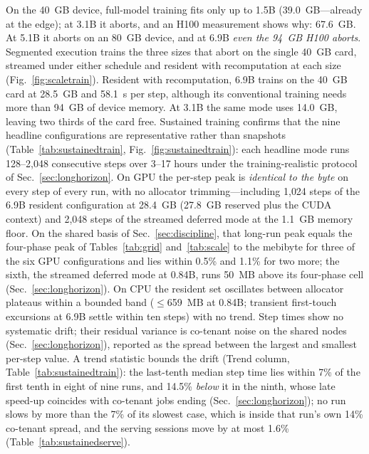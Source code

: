 \documentclass[journal]{IEEEtran}
\begin{document}
On the 40~GB device, full-model training
fits only up to 1.5B (39.0~GB---already at the edge); at 3.1B it aborts, and
an H100 measurement shows why: 67.6~GB. At 5.1B it aborts on an 80~GB device,
and at 6.9B \emph{even the 94~GB H100 aborts}. Segmented execution trains
the three sizes that abort on the single 40~GB card, streamed under either
schedule and resident with recomputation at each size
(Fig.~\ref{fig:scaletrain}). Resident with
recomputation, 6.9B trains on the 40~GB card at 28.5~GB and 58.1~s per
step, although its conventional training needs more than 94~GB of device
memory. At 3.1B the same mode uses 14.0~GB, leaving two thirds of the card
free.
Sustained training confirms that the nine headline configurations are
representative rather than snapshots
(Table~\ref{tab:sustainedtrain}, Fig.~\ref{fig:sustainedtrain}):
each headline mode runs 128--2{,}048 consecutive steps over 3--17 hours
under the training-realistic protocol of Sec.~\ref{sec:longhorizon}. On
GPU the per-step peak is \emph{identical to the byte} on every step of
every run, with no allocator trimming---including 1{,}024 steps of the
6.9B resident configuration at 28.4~GB (27.8~GB reserved plus the CUDA
context) and 2{,}048 steps of the streamed deferred mode at the 1.1~GB
memory floor. On the shared basis
of Sec.~\ref{sec:discipline}, that long-run peak equals the four-phase
peak of Tables~\ref{tab:grid} and~\ref{tab:scale} to the mebibyte for
three of the six GPU configurations and lies within 0.5\% and 1.1\% for two more; the
sixth, the streamed deferred mode at 0.84B, runs 50~MB above its
four-phase cell (Sec.~\ref{sec:longhorizon}). On CPU the resident set
oscillates between
allocator plateaus within a bounded band ($\le$659~MB at 0.84B; transient
first-touch excursions at 6.9B settle within ten steps) with no trend. Step
times show no systematic drift; their residual variance is co-tenant noise on the
shared nodes (Sec.~\ref{sec:longhorizon}), reported as the spread between
the largest and smallest per-step value. A trend statistic bounds the
drift (Trend column, Table~\ref{tab:sustainedtrain}): the
last-tenth median step time lies within 7\% of the first tenth in eight
of nine runs, and 14.5\% \emph{below} it in the ninth, whose late speed-up
coincides with co-tenant jobs ending (Sec.~\ref{sec:longhorizon}); no run
slows by more than the 7\% of its slowest case, which is inside that run's
own 14\% co-tenant spread, and the serving sessions move by at most 1.6\%
(Table~\ref{tab:sustainedserve}).
\end{document}
